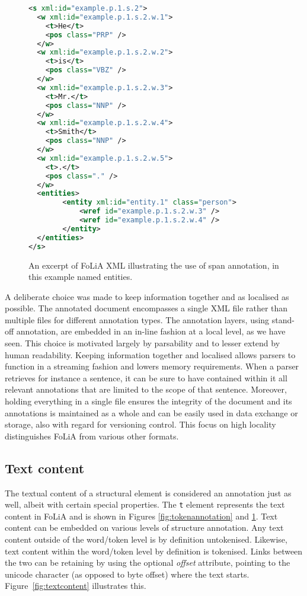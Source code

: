 \documentclass[a4paper,10pt,twoside]{article}
\begin{document}
\begin{figure}[tbh]
\label{fig:spanannotation}
\begin{lstlisting}[language=xml]
<s xml:id="example.p.1.s.2">
  <w xml:id="example.p.1.s.2.w.1">
    <t>He</t>
    <pos class="PRP" />
  </w>
  <w xml:id="example.p.1.s.2.w.2">
    <t>is</t>
    <pos class="VBZ" />
  </w>
  <w xml:id="example.p.1.s.2.w.3">
    <t>Mr.</t>
    <pos class="NNP" />
  </w>
  <w xml:id="example.p.1.s.2.w.4">
    <t>Smith</t>
    <pos class="NNP" />
  </w>
  <w xml:id="example.p.1.s.2.w.5">
    <t>.</t>
    <pos class="." />
  </w>
  <entities>
        <entity xml:id="entity.1" class="person">
            <wref id="example.p.1.s.2.w.3" />
            <wref id="example.p.1.s.2.w.4" />
        </entity>
  </entities>
</s>
\end{lstlisting}
\caption{An excerpt of FoLiA XML illustrating the use of span annotation, in this example named entities.}
\end{figure}

A deliberate choice was made to keep information together and as
localised as possible. The annotated document encompasses a single XML file
rather than multiple files for different annotation types. The annotation
layers,  using stand-off annotation, are embedded in an in-line fashion at a
local level, as we have seen. This choice is motivated largely by parsability
and to lesser extend by human readability. Keeping information together and
localised allows parsers to function in a streaming fashion and lowers memory
requirements. When a parser retrieves for instance a sentence, it can be sure to have
contained within it all relevant annotations that are limited to the scope of
that sentence. Moreover, holding everything in a single file ensures the integrity of the document and its
annotations is maintained as a whole and can be easily used in data exchange or
storage, also with regard for versioning control. This focus on high locality
distinguishes FoLiA from various other formats. 

\subsection{Text content} 

The textual content of a structural element is considered an annotation just as well,
albeit with certain special properties. The \texttt{t} element represents the
text content in FoLiA and is shown in Figures  \ref{fig:tokenannotation} and
\ref{fig:spanannotation}. Text content can be embedded on various levels of
structure annotation. Any text content outside of the word/token level is by
definition untokenised. Likewise, text content within the word/token level by
definition is tokenised. Links between the two can be retaining by using the
optional \emph{offset} attribute, pointing to the unicode character (as opposed
to byte offset) where the text starts. Figure~\ref{fig:textcontent} illustrates
this.
\end{document}
